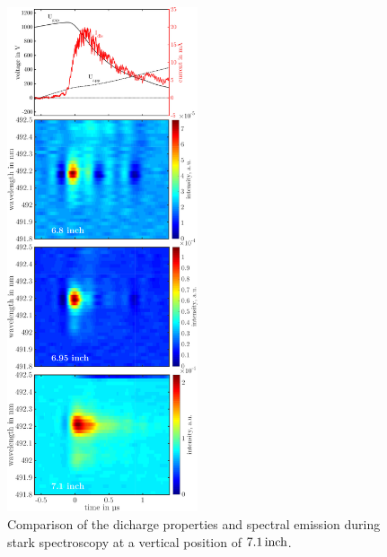 \documentclass[a4paper,10pt,twoside]{article}
\begin{document}
			\begin{figure}[t!]
				\centering
				\hspace{0.3cm}\includegraphics[width=0.5\textwidth,height=0.92\textheight]{figures/stark/combinations/starkallheightscombination.pdf}
				\caption{Comparison of the dicharge properties and spectral emission during stark spectroscopy at a vertical position of $\unit[7.1]{inch}$. }
				\label{img:stark71comparison}
			\end{figure}
		
\end{document}
